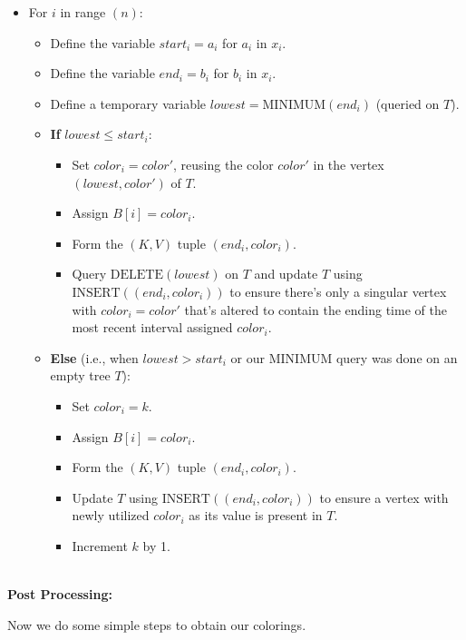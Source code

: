 \documentclass[11pt]{article}
\begin{document}
\begin{enumerate}
\begin{enumerate}
\begin{itemize}
    \item For $i$ in range $(n)$:
    \begin{itemize}
        \item Define the variable $start_i = a_i$  for $a_i$ in $x_i$.
        \item Define the variable $end_i = b_i$  for $b_i$ in $x_i$.
        \item Define a temporary variable $lowest = \text{MINIMUM}(end_i)$ (queried on $T$).
        \item \textbf{If} $lowest \leq start_i$:
            \begin{itemize}
                \item Set $color_i = color'$, reusing the color $color'$ in the vertex $(lowest, color')$ of $T$.
                \item Assign $B[i] = color_i$.
                \item Form the $(K, V)$ tuple $(end_i, color_i)$.
                \item Query $\text{DELETE}(lowest)$ on $T$ and update $T$ using $\text{INSERT}((end_i, color_i))$ to ensure there's only a singular vertex with $color_i = color'$ that's altered to contain the ending time of the most recent interval assigned $color_i$.
            \end{itemize}
        \item \textbf{Else} (i.e., when $lowest > start_i$ or our MINIMUM query was done on an empty tree $T$):
            \begin{itemize}
                \item Set $color_i = k$.
                \item Assign $B[i] = color_i$.
                \item Form the $(K, V)$ tuple $(end_i, color_i)$.
                \item Update $T$ using $\text{INSERT}((end_i, color_i))$ to ensure a vertex with newly utilized $color_i$ as its value is present in $T$.
                \item Increment $k$ by 1.
            \end{itemize}
    \end{itemize}
\end{itemize} \\

\textbf{Post Processing:} 

Now we do some simple steps to obtain our colorings.


\end{enumerate}
\end{enumerate}
\end{document}
